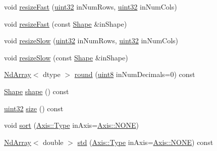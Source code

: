 \begin{DoxyCompactItemize}
\item 
void \mbox{\hyperlink{class_num_cpp_1_1_nd_array_a975989356bda11d4e679317b9903cb85}{resize\+Fast}} (\mbox{\hyperlink{namespace_num_cpp_a36f388e948380413c63011cab9b7fbd5}{uint32}} in\+Num\+Rows, \mbox{\hyperlink{namespace_num_cpp_a36f388e948380413c63011cab9b7fbd5}{uint32}} in\+Num\+Cols)
\item 
void \mbox{\hyperlink{class_num_cpp_1_1_nd_array_a2dcd826fd54aa63a56018a7d03b57fe0}{resize\+Fast}} (const \mbox{\hyperlink{class_num_cpp_1_1_shape}{Shape}} \&in\+Shape)
\item 
void \mbox{\hyperlink{class_num_cpp_1_1_nd_array_a9afb7dbd9ef7b1bb636fbf465fe2077d}{resize\+Slow}} (\mbox{\hyperlink{namespace_num_cpp_a36f388e948380413c63011cab9b7fbd5}{uint32}} in\+Num\+Rows, \mbox{\hyperlink{namespace_num_cpp_a36f388e948380413c63011cab9b7fbd5}{uint32}} in\+Num\+Cols)
\item 
void \mbox{\hyperlink{class_num_cpp_1_1_nd_array_a2c15c12587bdf8cdfd497b9848cb60f9}{resize\+Slow}} (const \mbox{\hyperlink{class_num_cpp_1_1_shape}{Shape}} \&in\+Shape)
\item 
\mbox{\hyperlink{class_num_cpp_1_1_nd_array}{Nd\+Array}}$<$ dtype $>$ \mbox{\hyperlink{class_num_cpp_1_1_nd_array_a44a74ea32c55394e57b3eec85c366c8e}{round}} (\mbox{\hyperlink{namespace_num_cpp_aee396d0469d6031cd18118c0a45bcdda}{uint8}} in\+Num\+Decimals=0) const
\item 
\mbox{\hyperlink{class_num_cpp_1_1_shape}{Shape}} \mbox{\hyperlink{class_num_cpp_1_1_nd_array_af150e9b412764425099944c4b3fb0a48}{shape}} () const
\item 
\mbox{\hyperlink{namespace_num_cpp_a36f388e948380413c63011cab9b7fbd5}{uint32}} \mbox{\hyperlink{class_num_cpp_1_1_nd_array_a27f831118f52436c1e0810fe6b0b940d}{size}} () const
\item 
void \mbox{\hyperlink{class_num_cpp_1_1_nd_array_aaebf5b951b3f751b893b3d9ecd58b047}{sort}} (\mbox{\hyperlink{struct_num_cpp_1_1_axis_ac10eb76f8631762d9ed70c40c42ca6cb}{Axis\+::\+Type}} in\+Axis=\mbox{\hyperlink{struct_num_cpp_1_1_axis_ac10eb76f8631762d9ed70c40c42ca6cba747ae657022cca1d87702b56d0c038e9}{Axis\+::\+N\+O\+NE}})
\item 
\mbox{\hyperlink{class_num_cpp_1_1_nd_array}{Nd\+Array}}$<$ double $>$ \mbox{\hyperlink{class_num_cpp_1_1_nd_array_a8e5826329c1e0701553e1963a2af40e0}{std}} (\mbox{\hyperlink{struct_num_cpp_1_1_axis_ac10eb76f8631762d9ed70c40c42ca6cb}{Axis\+::\+Type}} in\+Axis=\mbox{\hyperlink{struct_num_cpp_1_1_axis_ac10eb76f8631762d9ed70c40c42ca6cba747ae657022cca1d87702b56d0c038e9}{Axis\+::\+N\+O\+NE}}) const

\end{DoxyCompactItemize}
